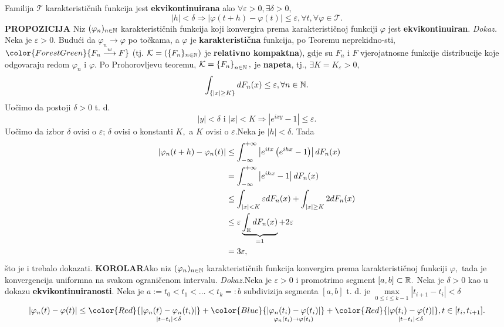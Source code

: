 \documentclass{article}
\begin{document}
Familija \(\mathcal T\) karakterističnih funkcija jest \textbf{ekvikontinuirana} ako \(\forall\varepsilon>0,\exists\delta>0,\) \[|h|<\delta\Rightarrow|\varphi(t+h)-\varphi(t)|\le\varepsilon,\forall t,\forall\varphi\in\mathcal T.\]
\textbf{PROPOZICIJA}\newline
Niz \((\varphi_n)_{n\in\Bbb N}\) karakterističnih funkcija koji konvergira prema karakterističnoj funkciji \(\varphi\) jest \textbf{ekvikontinuiran}.\newline\newline
\textit{Dokaz.}\newline
Neka je \(\varepsilon>0.\) Budući da \(\varphi_n\to\varphi\) po točkama, a \(\varphi\) je \textbf{karakteristična} funkcija, po Teoremu neprekidno-\newline sti, \(\color{ForestGreen}{F_n\overset{w}{\longrightarrow}F}\) (tj. \(\mathcal K=\left(\{F_n\}_{n\in\Bbb N}\right)\) je \textbf{relativno kompaktna}), gdje su \(F_n\) i \(F\) vjerojatnosne funkcije distribucije koje odgovaraju redom \(\varphi_n\) i \(\varphi.\) \newline Po Prohorovljevu teoremu, \(\mathcal K=\left\{F_n\right\}_{n\in\Bbb N},\) je \textbf{napeta}, tj., \(\exists K=K_\varepsilon>0,\) \[\int_{\left\{|x|\ge K\right\}}dF_n(x)\le\varepsilon,\forall n\in\Bbb N.\] Uočimo da postoji \(\delta>0\) t. d. \[|y|<\delta\text{ i }|x|<K\Rightarrow\left|e^{ixy}-1\right|\le\varepsilon.\] Uočimo da izbor \(\delta\) ovisi o \(\varepsilon\); \(\delta\) ovisi o konstanti \(K,\) a \(K\) ovisi o \(\varepsilon.\)\newline Neka je \(|h|<\delta.\) Tada \[\begin{aligned}|\varphi_n(t+h)-\varphi_n(t)|&\le\int_{-\infty}^{+\infty}\left|e^{itx}\left(e^{ihx}-1\right)\right|dF_n(x)\\&=\int_{-\infty}^{+\infty}\left|e^{ihx}-1\right|dF_n(x)\\&\le\int_{|x|<K}\varepsilon dF_n(x)+\int_{|x|\ge K}2dF_n(x)\\&\le\varepsilon\underbrace{\int_{\Bbb R}dF_n(x)}_{=1}+2\varepsilon\\&=3\varepsilon,\end{aligned}\] što je i trebalo dokazati.\newpage
\textbf{KOROLAR}\newline Ako niz \((\varphi_n)_{n\in\Bbb N}\) karakterističnih funkcija konvergira prema karakterističnoj funkciji \(\varphi,\)  tada je konvergencija uniformna na svakom ograničenom intervalu.\newline\newline
\textit{Dokaz.}\newline Neka je \(\varepsilon>0\) i promotrimo segment \([a,b]\subset\Bbb R.\) Neka je \(\delta>0\) kao u dokazu \textbf{ekvikontinuiranosti}. Neka je \(a:=t_0<t_1<\ldots<t_k=:b\) subdivizija segmenta \([a,b]\) t. d. je \(\max\limits_{0\le i\le k-1}|t_{i+1}-t_i|<\delta\) \[|\varphi_n(t)-\varphi(t)|\le{\color{Red}{\underset{|t-t_i|<\delta}{|\varphi_n(t)-\varphi_n(t_i)|}}}+{\color{Blue}{\underset{\varphi_n(t_i)\to\varphi(t_i)}{|\varphi_n(t_i)-\varphi(t_i)|}}}+{\color{Red}{\underset{|t-t_i|<\delta}{|\varphi(t_i)-\varphi(t)|}}},t\in[t_i,t_{i+1}].\]
\end{document}
